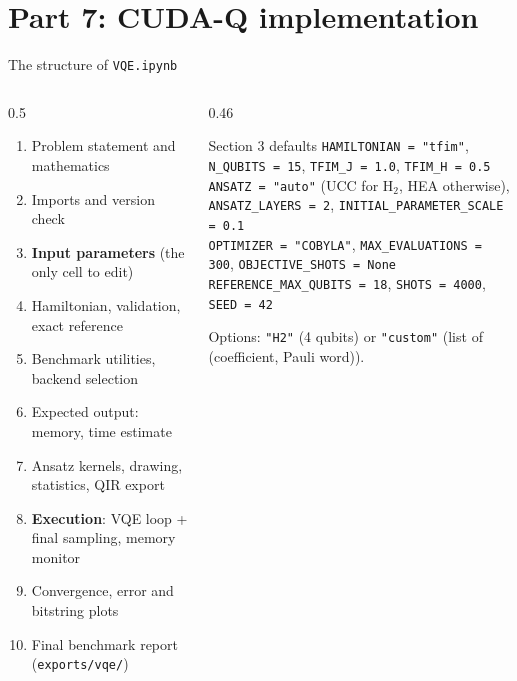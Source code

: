 \documentclass[aspectratio=169,11pt]{beamer}
\newcommand{\key}[1]{{\color{qdark}\textbf{#1}}}
\begin{document}
\section{Part 7: CUDA-Q implementation}
\begin{frame}{The structure of \texttt{VQE.ipynb}}
  \begin{columns}[T]
    \begin{column}{0.5\textwidth}
      \footnotesize
      \begin{enumerate}\itemsep0pt
        \item Problem statement and mathematics
        \item Imports and version check
        \item \key{Input parameters} (the only cell to edit)
        \item Hamiltonian, validation, exact reference
        \item Benchmark utilities, backend selection
        \item Expected output: memory, time estimate
        \item Ansatz kernels, drawing, statistics, QIR export
        \item \key{Execution}: VQE loop + final sampling, memory monitor
        \item Convergence, error and bitstring plots
        \item Final benchmark report (\texttt{exports/vqe/})
      \end{enumerate}
    \end{column}
    \begin{column}{0.46\textwidth}
      \begin{block}{Section 3 defaults}
        \small
        \texttt{HAMILTONIAN = "tfim"}, \texttt{N\_QUBITS = 15}, \texttt{TFIM\_J = 1.0}, \texttt{TFIM\_H = 0.5}\\
        \texttt{ANSATZ = "auto"} (UCC for H$_2$, HEA otherwise), \texttt{ANSATZ\_LAYERS = 2}, \texttt{INITIAL\_PARAMETER\_SCALE = 0.1}\\
        \texttt{OPTIMIZER = "COBYLA"}, \texttt{MAX\_EVALUATIONS = 300}, \texttt{OBJECTIVE\_SHOTS = None}\\
        \texttt{REFERENCE\_MAX\_QUBITS = 18}, \texttt{SHOTS = 4000}, \texttt{SEED = 42}
      \end{block}
      \small Options: \texttt{"H2"} (4 qubits) or \texttt{"custom"} (list of (coefficient, Pauli word)).
    \end{column}
  \end{columns}
\end{frame}
\end{document}
